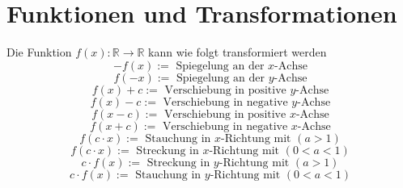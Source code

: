 \section{Funktionen und Transformationen}
Die Funktion $f\left(x\right):\mathbb{R}\rightarrow \mathbb{R}$ kann wie folgt transformiert werden
\begin{equation}
\boxed{-f(x):=\text{ Spiegelung an der }x\text{-Achse}}
\end{equation}
\begin{equation}
\boxed{f(-x):=\text{ Spiegelung an der }y\text{-Achse}}
\end{equation}
\begin{equation}
\boxed{f(x)+c:=\text{ Verschiebung in positive }y\text{-Achse}}
\end{equation}
\begin{equation}
\boxed{f(x)-c:=\text{ Verschiebung in negative }y\text{-Achse}}
\end{equation}
\begin{equation}
\boxed{f(x-c):=\text{ Verschiebung in positive }x\text{-Achse}}
\end{equation}
\begin{equation}
\boxed{f(x+c):=\text{ Verschiebung in negative }x\text{-Achse}}
\end{equation}
\begin{equation}
\boxed{f(c\cdot x):=\text{ Stauchung in }x\text{-Richtung mit }(a>1)}
\end{equation}
\begin{equation}
\boxed{f(c\cdot x):=\text{ Streckung in }x\text{-Richtung mit }(0<a<1)}
\end{equation}
\begin{equation}
\boxed{c\cdot f(x):=\text{ Streckung in }y\text{-Richtung mit }(a>1)}
\end{equation}
\begin{equation}
\boxed{c\cdot f(x):=\text{ Stauchung in }y\text{-Richtung mit }(0<a<1)}
\end{equation}
